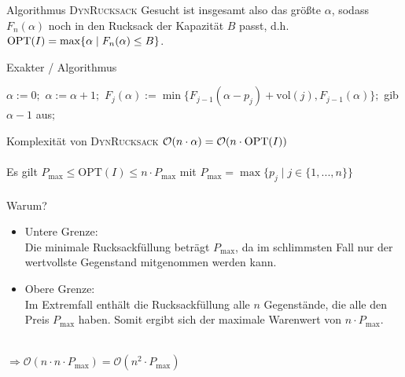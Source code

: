 \begin{frame}{Algorithmus \textsc{DynRucksack}}
    Gesucht ist insgesamt also das größte $\alpha$, sodass $F_n(\alpha)$ noch in den Rucksack der Kapazität $B$
    passt, d.h. $\operatorname{OPT}(I)=\max\{ \alpha \mid F_n(\alpha) \leq B \}$.
    
\begin{algorithm}[H]
    \caption{Exakter \rucksack/ Algorithmus}
        \begin{algorithmic}
            \State $\alpha:=0;$
            \Repeat
            \State $\alpha:=\alpha+1;$
            \State $F_j(\alpha):=\min\{F_{j-1}(\alpha-p_j)+\text{vol}(j),F_{j-1}(\alpha)\};$
            \EndFor
            \State gib $\alpha-1$ aus$;$
        \end{algorithmic}
\end{algorithm}



\end{frame}
\begin{frame}{Komplexität von \textsc{DynRucksack}}
    $\mathcal{O}( n \cdot \alpha) = \mathcal{O}( n \cdot \operatorname{OPT}(I))$ \\~\\
    \pause    
    Es gilt $P_{\text{max}} \leq \text{OPT}(I) \leq n \cdot P_{\text{max}}$ 
    \quad mit $P_{\text{max}}=\max\{p_j \mid j \in \{1,...,n\}\}$ \\~\\
    \pause
    Warum?
    \begin{itemize}
        \item Untere Grenze: \\ Die minimale Rucksackfüllung beträgt $P_{\text{max}}$, da im schlimmsten Fall nur der wertvollste Gegenstand mitgenommen werden kann.
        \item Obere Grenze:  \\ Im Extremfall enthält die Rucksackfüllung alle $n$ Gegenstände, die alle den Preis $P_{\text{max}}$ haben. Somit ergibt sich der maximale Warenwert von $n \cdot P_{\text{max}}$.
    \end{itemize} ~\\
    
    $\Rightarrow \mathcal{O}( n \cdot n \cdot P_{\max}) = \mathcal{O}( n^2 \cdot P_{\max})$    
\end{frame}
